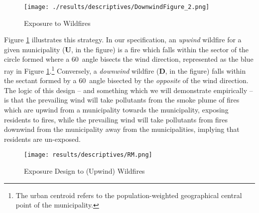 \documentclass[11pt]{article}
\begin{document}
\begin{spacing}{1.3}
\begin{figure}[htpb!]
    \centering
    \vspace{1mm}
    \texttt{[image: ./results/descriptives/DownwindFigure\_2.png]}
    \caption{Exposure to Wildfires}
    \label{fig:Downwind_Fig}
    \vspace{2mm}
\end{figure}

Figure \ref{fig:Downwind_Fig} illustrates this strategy. In our specification, an \textit{upwind} wildfire for a given municipality (\textbf{U}, in the figure) is a fire which falls within the sector of the circle formed where a 60\textdegree\  angle bisects the wind direction, represented as the blue ray in Figure \ref{fig:Downwind_Fig}.\footnote{The urban centroid refers to the population-weighted geographical central point of the municipality.} %
Conversely, a \textit{downwind} wildfire (\textbf{D}, in the figure) falls within the sectant formed by a 60\textdegree\ angle bisected by the \emph{opposite} of the wind direction.  The logic of this design -- and something which we will demonstrate empirically -- is that the prevailing wind will take pollutants from the smoke plume of fires which are upwind from a municipality towards the municipality, exposing residents to fires, while the prevailing wind will take pollutants from fires downwind from the municipality away from the municipalities, implying that residents are un-exposed.

\begin{figure}[htpb!]
    \centering
    \texttt{[image: results/descriptives/RM.png]}
    \caption{Exposure Design to (Upwind) Wildfires}
    \label{fig:design2}
\end{figure}    


\end{spacing}
\end{document}
